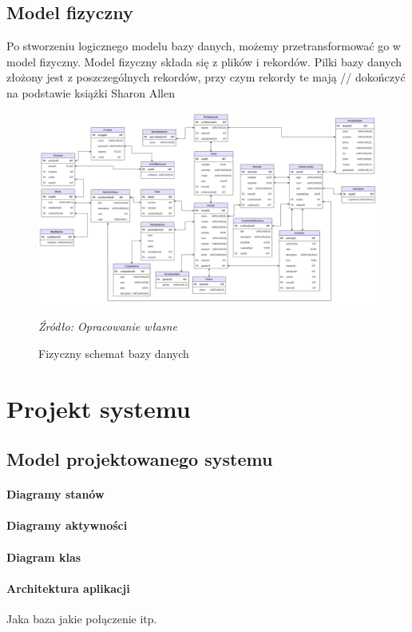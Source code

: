 \documentclass[12pt,twoside]{report}
\begin{document}
\section{Model fizyczny}
Po stworzeniu logicznego modelu bazy danych, możemy przetransformować go w model fizyczny. Model fizyczny składa się z plików i rekordów. Pilki bazy danych złożony jest z poszczególnych rekordów, przy czym rekordy te mają 
// dokończyć na podstawie książki Sharon Allen
\begin{figure}[H]
	\centering
	\includegraphics[scale=0.35]{DiagramFizyczny}
	\caption{Fizyczny schemat bazy danych}
	\textit{Źródło: Opracowanie własne}
	\label{DiagramFizyczny}
\end{figure}
\chapter{Projekt systemu}
\section{Model projektowanego systemu}
\subsubsection{Diagramy stanów}
\subsubsection{Diagramy aktywności}
\subsubsection{Diagram klas}
\subsubsection{Architektura aplikacji}
Jaka baza jakie połączenie itp.
\end{document}
